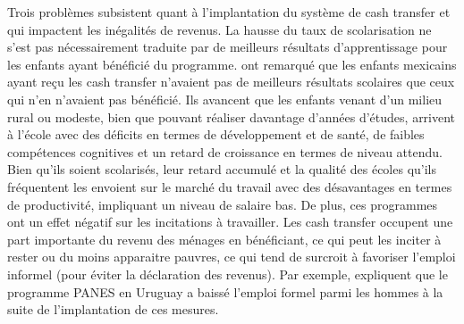 \documentclass[pagesize, twoside=off, bibliography=totoc, DIV=calc, fontsize=12pt, a4paper, french]{scrartcl}
\begin{document}
Trois problèmes subsistent quant à l’implantation du système de cash transfer et qui impactent les inégalités de revenus. La hausse du taux de scolarisation ne s’est pas nécessairement traduite par de meilleurs résultats d’apprentissage pour les enfants ayant bénéficié du programme.  ont remarqué que les enfants mexicains ayant reçu les cash transfer n’avaient pas de meilleurs résultats scolaires que ceux qui n’en n’avaient pas bénéficié. Ils avancent que les enfants venant d’un milieu rural ou modeste, bien que pouvant réaliser davantage d’années d’études, arrivent à l’école avec des déficits en termes de développement et de santé, de faibles compétences cognitives et un retard de croissance en termes de niveau attendu. Bien qu’ils soient scolarisés, leur retard accumulé et la qualité des écoles qu’ils fréquentent les envoient sur le marché du travail avec des désavantages en termes de productivité, impliquant un niveau de salaire bas. De plus, ces programmes ont un effet négatif sur les incitations à travailler. Les cash transfer occupent une part importante du revenu des ménages en bénéficiant, ce qui peut les inciter à rester ou du moins apparaitre pauvres, ce qui tend de surcroit à favoriser l’emploi informel (pour éviter la déclaration des revenus). Par exemple, \citet{amarante_2011} expliquent que le programme PANES en Uruguay a baissé l’emploi formel parmi les hommes à la suite de l’implantation de ces mesures. 
\end{document}
